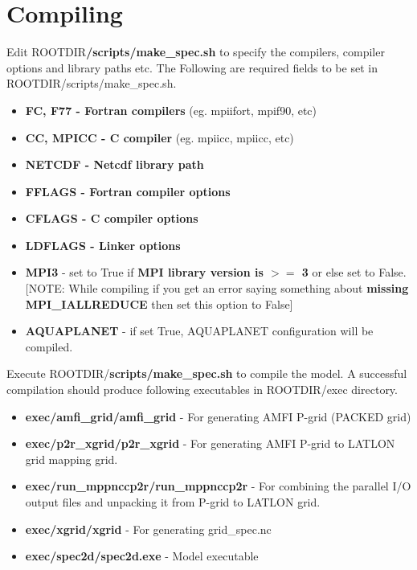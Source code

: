 \documentclass{article}
\begin{document}
\section{Compiling}
Edit ROOTDIR\textbf{/scripts/make\_spec.sh} to specify the compilers, compiler options and library paths etc.\newline
The Following are required fields to be set in ROOTDIR/scripts/make\_spec.sh.
\begin{itemize}
    \item \textbf{FC, F77 - Fortran compilers} (eg. mpiifort, mpif90, etc)
    \item \textbf{CC, MPICC - C compiler} (eg. mpiicc, mpiicc, etc)
    \item \textbf{NETCDF - Netcdf library path} 
    \item \textbf{FFLAGS - Fortran compiler options}
    \item \textbf{CFLAGS - C compiler options}
    \item \textbf{LDFLAGS - Linker options}
    \item \textbf{MPI3} - set to True if \textbf{MPI library version is $>=$ 3} or else set to False. [NOTE: While compiling if you get an error saying something about \textbf{missing MPI\_IALLREDUCE} then set this option to False]
    \item \textbf{AQUAPLANET} - if set True, AQUAPLANET configuration will be compiled.
\end{itemize}
Execute ROOTDIR/\textbf{scripts/make\_spec.sh} to compile the model.\newline
A successful compilation should produce following executables in ROOTDIR/exec directory.
\begin{itemize}
    \item \textbf{exec/amfi\_grid/amfi\_grid} - For generating AMFI P-grid (PACKED grid)
    \item \textbf{exec/p2r\_xgrid/p2r\_xgrid} - For generating AMFI P-grid to LATLON grid mapping grid.
    \item \textbf{exec/run\_mppnccp2r/run\_mppnccp2r} - For combining the parallel I/O output files and unpacking it from P-grid to LATLON grid.
    \item \textbf{exec/xgrid/xgrid} - For generating grid\_spec.nc
    \item \textbf{exec/spec2d/spec2d.exe} - Model executable
\end{itemize}
\end{document}

